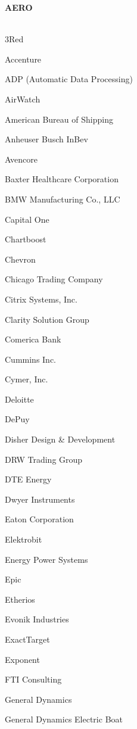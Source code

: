 \documentclass[twoside]{article}
\begin{document}
    \begin{center}\begin{multicols}{5}
    {\fontsize{14}{16}\selectfont \bf AERO}\\
        \vspace{-1em}
        ~\hrulefill~
        \vspace{-.9em}
        \begin{FlushLeft}
        \begin{compactitem}
        \item 3Red
\item Accenture
\item ADP (Automatic Data Processing)
\item AirWatch
\item American Bureau of Shipping
\item Anheuser Busch InBev
\item Avencore
\item Baxter Healthcare Corporation
\item BMW Manufacturing Co., LLC
\item Capital One
\item Chartboost
\item Chevron
\item Chicago Trading Company
\item Citrix Systems, Inc.
\item Clarity Solution Group
\item Comerica Bank
\item Cummins Inc.
\item Cymer, Inc.
\item Deloitte
\item DePuy
\item Disher Design \& Development
\item DRW Trading Group
\item DTE Energy
\item Dwyer Instruments
\item Eaton Corporation
\item Elektrobit
\item Energy Power Systems
\item Epic
\item Etherios
\item Evonik Industries
\item ExactTarget
\item Exponent
\item FTI Consulting
\item General Dynamics
\item General Dynamics Electric Boat

\end{compactitem}
\end{FlushLeft}
\end{multicols}
\end{center}
\end{document}
